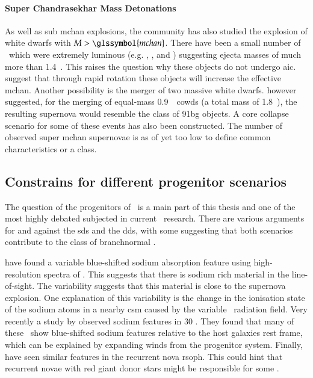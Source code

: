 \paragraph{Super Chandrasekhar Mass Detonations}
As well as sub \gls{mchan} explosions, the community has also studied the explosion of white dwarfs with $M>\glssymbol{mchan}$. There have been a small number of \sneia\ which were extremely luminous (e.g. , ,  and ) suggesting ejecta masses of much more than 1.4~\msun \citep{2006Natur.443..308H,2007ApJ...669L..17H,2009ApJ...707L.118Y,2010ApJ...713.1073S,2010ApJ...714.1209T,2011MNRAS.410..585S,2011MNRAS.412.2735T}. This raises the question why these objects do not undergo \gls{aic}. \cite{2005A&A...435..967Y} suggest that through rapid rotation these objects will increase the effective \gls{mchan}. Another possibility is the merger of two massive white dwarfs. \citet{2010Natur.463...61P} however suggested, for the merging of equal-mass 0.9~\msun\ \glspl{cowd} (a total mass of 1.8~\msun), the resulting supernova would resemble the class of \gls{91bg} objects. A core collapse scenario for some of these events has also been constructed. The number of observed super \gls{mchan} supernovae is as of yet too low to define common characteristics or a class.


\subsection{Constrains for different progenitor scenarios}
\label{sec:progenitor_constraints}
The question of the progenitors of \sneia\ is a main part of this thesis and one of the most highly debated subjected in current \sneia\ research. There are various arguments for and against the \gls{sds} and the \gls{dds}, with some suggesting that both scenarios contribute to the class of \gls{branchnormal} \sneia.


\cite{2007Sci...317..924P} have found a variable blue-shifted sodium absorption feature using high-resolution spectra of \sneia. This suggests that there is sodium rich material in the line-of-sight. The variability suggests that this material is close to the supernova explosion. One explanation of this variability is the change in the ionisation state of the sodium atoms in a nearby \gls{csm} caused by the variable \snia\ radiation field. Very recently a study by \cite{2011arXiv1108.3664S} observed sodium features in 30 \sneia. They found that many of these \sneia\ show blue-shifted sodium features relative to the host galaxies rest frame, which can be explained by expanding winds from the progenitor system. Finally, \citet{2011A&A...530A..63P} have seen similar features in the recurrent nova \gls{rsoph}. This could hint that recurrent novae with red giant donor stars might be responsible for some \sneia. 

